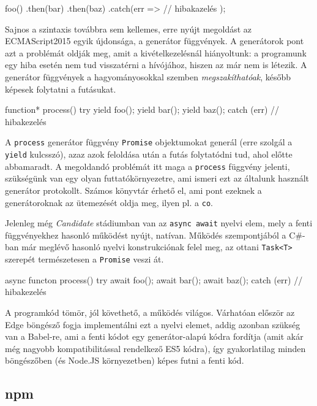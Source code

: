 \begin{js}
foo()
  .then(bar)
  .then(baz)
  .catch(err => {
    // hibakazelés
  });
\end{js}

Sajnos a szintaxis továbbra sem kellemes, erre nyújt megoldást az ECMAScript2015
egyik újdonsága, a generátor függvények. A generátorok pont azt a problémát
oldják meg, amit a kivételkezelésnál hiányoltunk: a programunk egy hiba esetén
nem tud visszatérni a hívójához, hiszen az már nem is létezik.  A generátor
függvények a hagyományosokkal szemben \emph{megszakíthatóak}, később képesek
folytatni a futásukat.

\begin{js}
function* process() {
  try {
    yield foo();
    yield bar();
    yield baz();
  } catch (err) {
    // hibakezelés
  }
}
\end{js}

A \texttt{process} generátor függvény \texttt{Promise} objektumokat generál
(erre szolgál a \texttt{yield} kulcsszó), azaz azok feloldása után a futás
folytatódni tud, ahol előtte abbamaradt.  A megoldandó problémát itt maga a
\texttt{process} függvény jelenti, szükségünk van egy olyan futtatókörnyezetre,
ami ismeri ezt az általunk használt generátor protokollt.  Számos könyvtár
érhető el, ami pont ezeknek a generátoroknak az ütemezését oldja meg, ilyen pl.
a \texttt{co}.

Jelenleg még \emph{Candidate} stádiumban van az \texttt{async await} nyelvi
elem, mely a fenti függvényekhez hasonló működést nyújt, natívan.  Működés
szempontjából a C\#-ban már meglévő hasonló nyelvi konstrukciónak felel meg, az
ottani \texttt{Task<T>} szerepét természetesen a \texttt{Promise} veszi át.

\begin{js}
async functon process() {
  try {
    await foo();
    await bar();
    await baz();
  } catch (err) {
    // hibakezelés
  }
}
\end{js}

A programkód tömör, jól követhető, a működés világos.  Várhatóan először az Edge
böngésző fogja implementálni ezt a nyelvi elemet, addig azonban szükség van a
Babel-re, ami a fenti kódot egy generátor-alapú kódra fordítja (amit akár még
nagyobb kompatibilitással rendelkező ES5 kódra), így gyakorlatilag minden
böngészőben (és Node.JS környezetben) képes futni a fenti kód.

\subsection{npm}

